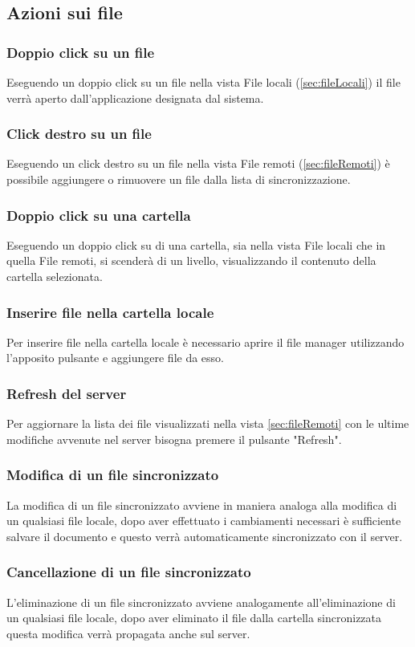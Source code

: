 \subsection{Azioni sui file}
\label{sec:fileActions}

\subsubsection{Doppio click su un file}
Eseguendo un doppio click su un file nella vista File locali (\ref{sec:fileLocali}) il file verrà aperto dall'applicazione designata dal sistema.
\subsubsection{Click destro su un file}
Eseguendo un click destro su un file nella vista File remoti (\ref{sec:fileRemoti}) è possibile aggiungere o rimuovere un file dalla lista di sincronizzazione.  
\subsubsection{Doppio click su una cartella}
Eseguendo un doppio click su di una cartella, sia nella vista File locali che in quella File remoti, si scenderà di un livello, visualizzando il contenuto della cartella selezionata.
\subsubsection{Inserire file nella cartella locale}
Per inserire file nella cartella locale è necessario aprire il file manager utilizzando l'apposito pulsante e aggiungere file da esso.
\subsubsection{Refresh del server}
Per aggiornare la lista dei file visualizzati nella vista \ref{sec:fileRemoti} con le ultime modifiche avvenute nel server bisogna premere il pulsante "Refresh".
\subsubsection{Modifica di un file sincronizzato}
La modifica di un file sincronizzato avviene in maniera analoga alla modifica di un qualsiasi file locale, dopo aver effettuato i cambiamenti necessari è sufficiente salvare il documento e questo verrà automaticamente sincronizzato con il server.
\subsubsection{Cancellazione di un file sincronizzato}
L'eliminazione di un file sincronizzato avviene analogamente all'eliminazione di un qualsiasi file locale, dopo aver eliminato il file dalla cartella sincronizzata questa modifica verrà propagata anche sul server.

